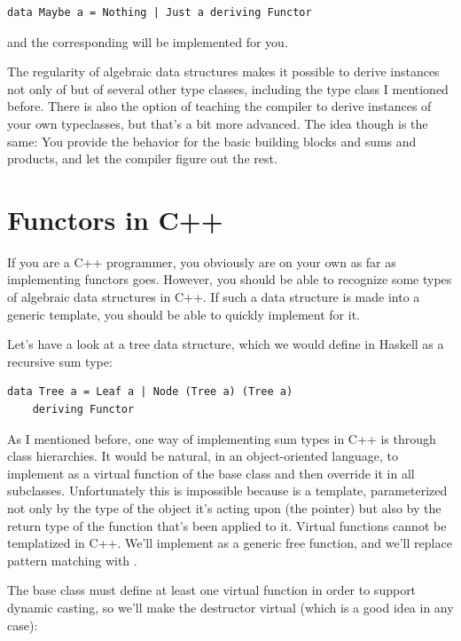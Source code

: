 \begin{Verbatim}[commandchars=\\\{\}]
data Maybe a = Nothing | Just a deriving Functor
\end{Verbatim}
and the corresponding  will be implemented for you.

The regularity of algebraic data structures makes it possible to derive
instances not only of  but of several other type
classes, including the  type class I mentioned before. There
is also the option of teaching the compiler to derive instances of your
own typeclasses, but that's a bit more advanced. The idea though is the
same: You provide the behavior for the basic building blocks and sums
and products, and let the compiler figure out the rest.

\section{Functors in C++}\label{functors-in-c}

If you are a C++ programmer, you obviously are on your own as far as
implementing functors goes. However, you should be able to recognize
some types of algebraic data structures in C++. If such a data structure
is made into a generic template, you should be able to quickly implement
 for it.

Let's have a look at a tree data structure, which we would define in
Haskell as a recursive sum type:

\begin{Verbatim}[commandchars=\\\{\}]
data Tree a = Leaf a | Node (Tree a) (Tree a)
    deriving Functor
\end{Verbatim}
As I mentioned before, one way of implementing sum types in C++ is
through class hierarchies. It would be natural, in an object-oriented
language, to implement  as a virtual function of the base
class  and then override it in all subclasses.
Unfortunately this is impossible because  is a template,
parameterized not only by the type of the object it's acting upon (the
 pointer) but also by the return type of the function
that's been applied to it. Virtual functions cannot be templatized in
C++. We'll implement  as a generic free function, and we'll
replace pattern matching with .

The base class must define at least one virtual function in order to
support dynamic casting, so we'll make the destructor virtual (which is
a good idea in any case):

